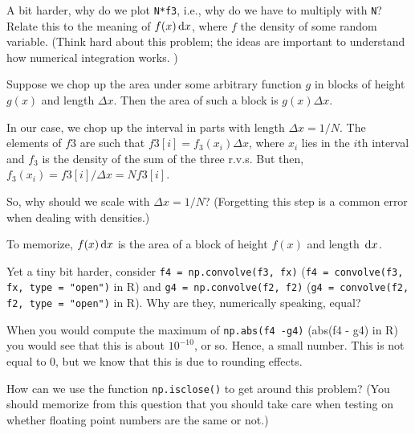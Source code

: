 \begin{exercise}
A bit harder, why do we plot \texttt{N*f3}, i.e., why do we have to multiply with \texttt{N}? Relate this to the meaning of $f(x)\,\textrm{d}x$, where $f$ the density of some random variable.
(Think hard about this problem; the ideas are important to understand how numerical integration works. )
\begin{hint}
  Suppose we chop up the area under some arbitrary  function $g$ in blocks of height $g(x)$ and length $\Delta x$.
  Then the area of such a block is $g(x) \Delta x$.


  In our case, we chop up the interval in parts with length $\Delta x = 1/N$.
  The elements of $f3$ are such that $f3[i] = f_{3}(x_{i}) \Delta x$, where $x_{i}$ lies in the $i$th interval and $f_{3}$ is the density of the sum of the three r.v.s. But then, $f_{3}(x_{i}) = f3[i]/\Delta x = N f3[i]$.

So, why should we  scale with $\Delta x = 1/N$? (Forgetting this step is a common error when dealing with densities.)

To memorize, $f(x) \,\textrm{d}x$ is the area of a block of height $f(x)$ and length $\,\textrm{d}x$.
\end{hint}
\end{exercise}

\begin{exercise}
Yet a tiny bit harder, consider \texttt{f4 = np.convolve(f3, fx)} (\texttt{f4 = convolve(f3, fx, type = "open")} in R) and \texttt{g4 = np.convolve(f2, f2)} (\texttt{g4 = convolve(f2, f2, type = "open")} in R). Why are they, numerically speaking,  equal?
\end{exercise}


\begin{exercise}
When you would compute the maximum of \texttt{np.abs(f4 -g4)} (abs(f4 - g4) in R) you would see that this is about $10^{-10}$, or so.
Hence, a small number.
This is not equal to 0, but we know that this is due to rounding effects.

How can we use the function \texttt{np.isclose()} to get around this problem?
(You should memorize from this question that you should take care when testing on whether floating point numbers are the same or not.)
\end{exercise}
